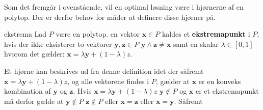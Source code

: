 Som det fremgår i ovenstående, vil en optimal løsning være i hjørnerne af en polytop.
Der er derfor behov for måder at definere disse hjørner på.

\begin{defn}{}{ekstrema}
Lad $P$ være en polytop. en vektor $\mathbf{x} \in P$ kaldes et \textbf{ekstremapunkt} i $P$, hvis der ikke eksisterer to vektorer $\mathbf{y},\mathbf{z} \in P$ $\mathbf{y} \land \mathbf{z} \neq \mathbf{x}$ samt en skalar $\lambda \in [0,1]$ hvorom det gælder: $\mathbf{x}=\lambda\mathbf{y}+(1-\lambda)z$.
\end{defn}
Et hjørne kan beskrives ud fra denne definition idet der såfremt $\mathbf{x}=\lambda\mathbf{y}+(1-\lambda)z$, og alle vektorene findes i $P$, gælder at $\mathbf{x}$ er en konveks kombination af $\mathbf{y}$ og $\mathbf{z}$.
Hvis $\mathbf{x}=\lambda\mathbf{y}+(1-\lambda)z$ $\mathbf{y}\notin P$ og $\mathbf{x}$ er et ekstremapunkt må derfor gælde at $\mathbf{y}\notin P$ $\mathbf{z}\notin P$ eller $\mathbf{x}=\mathbf{z}$ eller $\mathbf{x}=\mathbf{y}$. Såfremt 


